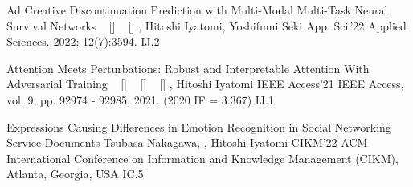 
\begin{publications}
    \publication
    {Ad Creative Discontinuation Prediction with Multi-Modal Multi-Task Neural Survival Networks}
    {
    ~ [\href{https://www.mdpi.com/2076-3417/12/7/3594}{\small{\linkSymbol}}]
    ~ [\href{https://arxiv.org/abs/2204.11588}{\small{\arxivSymbol}}]
    }
    {\underline{}, Hitoshi Iyatomi, Yoshifumi Seki}
    {App. Sci.'22} {Applied Sciences. 2022; 12(7):3594.} {IJ.2}

    \publication
    {Attention Meets Perturbations: Robust and Interpretable Attention With Adversarial Training}
    {
    ~ [\href{https://ieeexplore.ieee.org/document/9467291}{\small{\linkSymbol}}]
    ~ [\href{https://arxiv.org/abs/2009.12064}{\small{\arxivSymbol}}]
    ~ [\href{https://github.com/shunk031/attention-meets-perturbation}{\small{\githubSymbol}}]
    }
    {\underline{}, Hitoshi Iyatomi}
    {IEEE Access'21} {IEEE Access, vol. 9, pp. 92974 - 92985, 2021. (2020 IF = 3.367)} {IJ.1}

    \publication
    {Expressions Causing Differences in Emotion Recognition in Social Networking Service Documents}
    {
    }
    {Tsubasa Nakagawa, \underline{}, Hitoshi Iyatomi}
    {CIKM'22} {ACM International Conference on Information and Knowledge Management (CIKM), Atlanta, Georgia, USA} {IC.5}
\end{publications}

